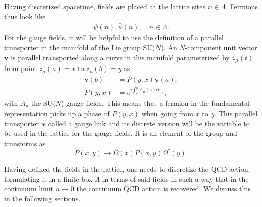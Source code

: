 Having discretized spacetime, fields are placed at the lattice sites $n\in\Lambda$. Fermions thus look like
\begin{gather}
\psi(n),\bar{\psi}(n), \quad
n\in\Lambda.
\end{gather}
For the gauge fields, it will be helpful to use the definition of a parallel transporter in the manifold of the Lie group SU($N$). An $N$-component unit vector $\boldsymbol{v}$ is parallel transported along a curve in this manifold parameterized by $z_{\mu}(t)$ from point $z_{\mu}(a)=x$ to $z_{\mu}(b)=y$ as
\begin{align}
\boldsymbol{v}(b)&=P(y,x)\boldsymbol{v}(a),\\
P(y,x)&=e^{i\int_x^yA_{\mu}(z)dz_{\mu}},
\end{align}
with $A_{\mu}$ the SU($N$) gauge fields. This means that a fermion in the fundamental representation picks up a phase of $P(y,x)$ when going from $x$ to $y$. This parallel transporter is called a gauge link and its discrete version will be the variable to be used in the lattice for the gauge fields. It is an element of the group and transforms as
\begin{equation}
P(x,y)\to\Omega(x)P(x,y)\Omega^{\dagger}(y).
\end{equation}

Having defined the fields in the lattice, one needs to discretize the QCD action, formulating it in a finite box $\Lambda$ in terms of said fields in such a way that in the continuum limit $a\rightarrow 0$ the continuum QCD action is recovered. We discuss this in the following sections.	

